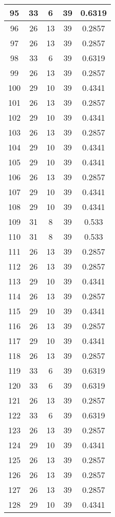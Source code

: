 \documentclass[letterpaper, 12pt]{article}
\begin{document}
\begin{longtable}{|c|c|c|c|c|}
95 & 33 & 6 & 39 & 0.6319 \\
\hline
96 & 26 & 13 & 39 & 0.2857 \\
\hline
97 & 26 & 13 & 39 & 0.2857 \\
\hline
98 & 33 & 6 & 39 & 0.6319 \\
\hline
99 & 26 & 13 & 39 & 0.2857 \\
\hline
100 & 29 & 10 & 39 & 0.4341 \\
\hline
101 & 26 & 13 & 39 & 0.2857 \\
\hline
102 & 29 & 10 & 39 & 0.4341 \\
\hline
103 & 26 & 13 & 39 & 0.2857 \\
\hline
104 & 29 & 10 & 39 & 0.4341 \\
\hline
105 & 29 & 10 & 39 & 0.4341 \\
\hline
106 & 26 & 13 & 39 & 0.2857 \\
\hline
107 & 29 & 10 & 39 & 0.4341 \\
\hline
108 & 29 & 10 & 39 & 0.4341 \\
\hline
109 & 31 & 8 & 39 & 0.533 \\
\hline
110 & 31 & 8 & 39 & 0.533 \\
\hline
111 & 26 & 13 & 39 & 0.2857 \\
\hline
112 & 26 & 13 & 39 & 0.2857 \\
\hline
113 & 29 & 10 & 39 & 0.4341 \\
\hline
114 & 26 & 13 & 39 & 0.2857 \\
\hline
115 & 29 & 10 & 39 & 0.4341 \\
\hline
116 & 26 & 13 & 39 & 0.2857 \\
\hline
117 & 29 & 10 & 39 & 0.4341 \\
\hline
118 & 26 & 13 & 39 & 0.2857 \\
\hline
119 & 33 & 6 & 39 & 0.6319 \\
\hline
120 & 33 & 6 & 39 & 0.6319 \\
\hline
121 & 26 & 13 & 39 & 0.2857 \\
\hline
122 & 33 & 6 & 39 & 0.6319 \\
\hline
123 & 26 & 13 & 39 & 0.2857 \\
\hline
124 & 29 & 10 & 39 & 0.4341 \\
\hline
125 & 26 & 13 & 39 & 0.2857 \\
\hline
126 & 26 & 13 & 39 & 0.2857 \\
\hline
127 & 26 & 13 & 39 & 0.2857 \\
\hline
128 & 29 & 10 & 39 & 0.4341 \\

\end{longtable}
\end{document}
